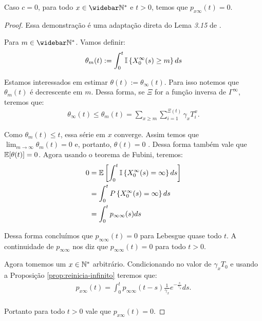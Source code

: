 \begin{proposicao}
  \label{prop:naocontinuidade}
  Caso $c = 0$, para todo $x \in \Nzb$ e $t > 0$, temos que $p_{x
    \infty} (t) = 0$.
\end{proposicao}
\begin{proof}
  Essa demonstração é uma adaptação direta do Lema \emph{3.15} de
  \cite{fontes:08}.

  Para $m \in \Nzb$. Vamos definir:
  \begin{align*}
    \theta_m(t) := \int_0^t {\mathbb{I}} \left\{ X^\infty_0(s) \geq m \right\} ds
  \end{align*}

  Estamos interessados em estimar $\theta(t) :=
  \theta_\infty(t)$. Para isso notemos que $\theta_m(t)$ é decrescente em
  $m$. Dessa forma, se $\Xi$ for a função inversa de $\Gamma^\infty$, teremos
  que:
  \begin{align*}
    \theta_\infty(t) \leq \theta_m(t) = \sum_{x \geq m}
    \sum_{i=1}^{\Xi(t)} \gamma_x T^x_i.
  \end{align*}


  Como $\theta_m(t) \leq t$, essa série em $x$ converge. Assim temos
  que $\lim_{m\to\infty} \theta_m(t) = 0$ \qc e, portanto, $\theta(t) =
  0$ \qc. Dessa forma também vale que ${\mathbb{E}}[\theta(t)] = 0$. Agora
  usando o teorema de Fubini, teremos:
  \begin{align*}
    0 &= {\mathbb{E}}\left[ \int_0^t {\mathbb{I}} \left\{ X^\infty_0(s) = \infty
      \right\} ds \right]\\
    &= \int_0^t P \left\{ X^\infty_0(s) = \infty
    \right\} ds\\
    &= \int_0^t p_{\infty \infty} (s) ds
  \end{align*}

  Dessa forma concluímos que $p_{\infty \infty} (t) = 0$ para Lebesgue
  quase todo $t$. A continuidade de $p_{\infty \infty}$ nos diz que
  $p_{\infty \infty}(t) = 0$ para todo $t > 0$.

  Agora tomemos um $x \in {\mathbb{N^*}}$ arbitrário. Condicionando no valor de
  $\gamma_x T_0$ e usando a Proposição \ref{prop:reinicia-infinito}
  teremos que:
  \begin{align*}
    p_{x \infty} (t) = \int_0^t p_{\infty \infty} (t-s)
    \frac{1}{\gamma_x}e^{-\frac{s}{\gamma_x}} ds.\\
  \end{align*}

  Portanto para todo $t > 0$ vale que $p_{x \infty} (t) = 0$.


\end{proof}


